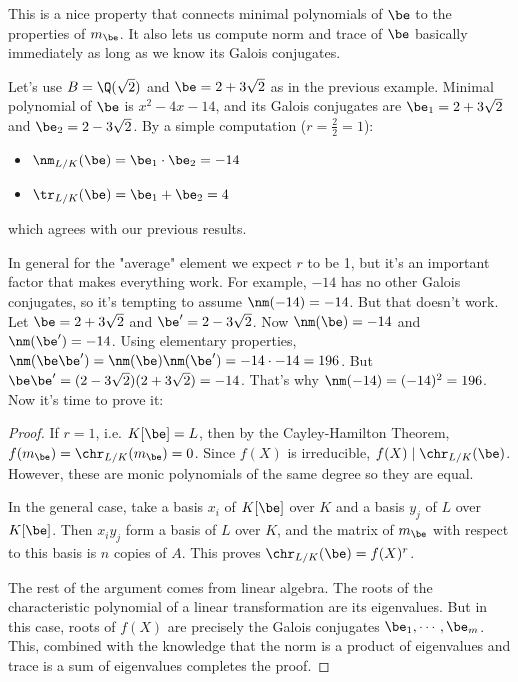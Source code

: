 This is a nice property that connects minimal polynomials of $\be$ to the properties of $m_\be$. It also lets us compute norm and trace of $\be$ basically immediately as long as we know its Galois conjugates.

\begin{ex}
Let's use $B = \Q(\sqrt{2})$ and $\be = 2+3\sqrt{2}$ as in the previous example. Minimal polynomial of $\be$ is $x^2 - 4x - 14$, and its Galois conjugates
are $\be_1 = 2+3\sqrt{2}$ and $\be_2 = 2-3\sqrt{2}$. By a simple computation ($r = \frac{2}{2} = 1$):
\begin{itemize}
\item $\nm_{L/K}(\be) = \be_1 \cdot \be_2 = -14$
\item $\tr_{L/K}(\be) = \be_1 + \be_2 = 4$
\end{itemize}
which agrees with our previous results.
\end{ex}

\begin{rem}
In general for the "average" element we expect $r$ to be 1, but it's an important factor that makes everything work. For example, $-14$ has no other Galois conjugates, so it's tempting to assume $\nm(-14) = -14$.
But that doesn't work. Let $\be = 2+3\sqrt{2}$ and $\be' = 2-3\sqrt{2}$. Now $\nm(\be) = -14$ and $\nm(\be') = -14$. Using elementary properties, $\nm(\be\be') = \nm(\be) \nm (\be') = -14 \cdot -14 = 196$. But $\be\be' = (2-3\sqrt{2})(2+3\sqrt{2}) = -14$.
That's why $\nm(-14) = (-14)^2 = 196$. Now it's time to prove it:
\end{rem}

\begin{proof}
If $r=1$, i.e. $K[\be]=L$, then by the Cayley-Hamilton Theorem, $f(m_{\be}) = \chr_{L/K}(m_\be) = 0$. Since $f(X)$ is irreducible, $f(X)\mid \chr_{L/K}(\be)$. However, these are monic polynomials of the same degree so they are equal. 

In the general case, take a basis $x_i$ of $K[\be]$ over $K$ and a basis $y_j$ of $L$ over $K[\be]$. Then $x_iy_j$ form a basis of $L$ over $K$, and the matrix of $m_{\be}$ with respect to this basis is $n$ copies of $A$. This proves $\chr_{L/K}(\be)=f(X)^r$.

The rest of the argument comes from linear algebra. The roots of the characteristic polynomial of a linear transformation are its eigenvalues. But in this case, roots of $f(X)$ are precisely the Galois conjugates $\be_1, \cdots, \be_m$.
This, combined with the knowledge that the norm is a product of eigenvalues and trace is a sum of eigenvalues completes the proof. 
\end{proof}

